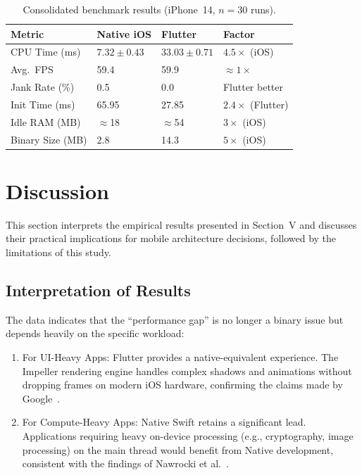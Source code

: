 \documentclass[journal]{IEEEtran}
\begin{document}
\begin{table}[H]
	\caption{Consolidated benchmark results (iPhone~14, $n = 30$ runs).}
	\label{tab:summary}
	\centering
	\footnotesize
	\begin{tabular}{llll}
		\toprule
		\textbf{Metric}  & \textbf{Native iOS} & \textbf{Flutter} & \textbf{Factor}       \\
		\midrule
		CPU Time (ms)    & $7.32 \pm 0.43$     & $33.03 \pm 0.71$ & $4.5\times$ (iOS)     \\
		Avg.\ FPS        & 59.4                & 59.9             & $\approx 1\times$     \\
		Jank Rate (\%)   & 0.5                 & 0.0              & Flutter better        \\
		Init Time (ms)   & 65.95               & 27.85            & $2.4\times$ (Flutter) \\
		Idle RAM (MB)    & $\approx$18         & $\approx$54      & $3\times$ (iOS)       \\
		Binary Size (MB) & 2.8                 & 14.3             & $5\times$ (iOS)       \\
		\bottomrule
	\end{tabular}
\end{table}

\section{Discussion}
This section interprets the empirical results presented in Section~V and discusses their practical implications for mobile architecture decisions, followed by the limitations of this study.

\subsection{Interpretation of Results}
The data indicates that the ``performance gap'' is no longer a binary issue but depends heavily on the
specific workload:

\begin{enumerate}
	\item For UI-Heavy Apps: Flutter provides a native-equivalent experience. The Impeller rendering engine handles
	      complex shadows and animations without dropping frames on modern iOS hardware, confirming the claims made by Google~\cite{impeller2024}.
	\item For Compute-Heavy Apps: Native Swift retains a significant lead. Applications requiring heavy
	      on-device processing (e.g., cryptography, image processing) on the main thread would benefit from
	      Native development, consistent with the findings of Nawrocki et al.~\cite{nawrocki2021}.
\end{enumerate}
\end{document}
